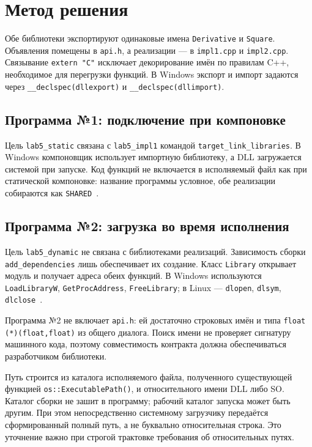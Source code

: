 \section{Метод решения}
Обе библиотеки экспортируют одинаковые имена \texttt{Derivative} и \texttt{Square}. Объявления помещены в \texttt{api.h}, а реализации --- в \texttt{impl1.cpp} и \texttt{impl2.cpp}. Связывание \texttt{extern "C"} исключает декорирование имён по правилам C++, необходимое для перегрузки функций. В Windows экспорт и импорт задаются через \texttt{\_\_declspec(dllexport)} и \texttt{\_\_declspec(dllimport)}.

\subsection{Программа №1: подключение при компоновке}
Цель \texttt{lab5\_static} связана с \texttt{lab5\_impl1} командой \texttt{target\_link\_libraries}. В Windows компоновщик использует импортную библиотеку, а DLL загружается системой при запуске. Код функций не включается в исполняемый файл как при статической компоновке: название программы условное, обе реализации собираются как \texttt{SHARED}~\cite{loadtime}.

\subsection{Программа №2: загрузка во время исполнения}
Цель \texttt{lab5\_dynamic} не связана с библиотеками реализаций. Зависимость сборки \texttt{add\_dependencies} лишь обеспечивает их создание. Класс \texttt{Library} открывает модуль и получает адреса обеих функций. В Windows используются \texttt{LoadLibraryW}, \texttt{GetProcAddress}, \texttt{FreeLibrary}; в Linux --- \texttt{dlopen}, \texttt{dlsym}, \texttt{dlclose}~\cite{runtime,dlopen,dlsym}.

Программа №2 не включает \texttt{api.h}: ей достаточно строковых имён и типа \texttt{float (*)(float,float)} из общего диалога. Поиск имени не проверяет сигнатуру машинного кода, поэтому совместимость контракта должна обеспечиваться разработчиком библиотеки.

Путь строится из каталога исполняемого файла, полученного существующей функцией \texttt{os::ExecutablePath()}, и относительного имени DLL либо SO. Каталог сборки не зашит в программу; рабочий каталог запуска может быть другим. При этом непосредственно системному загрузчику передаётся сформированный полный путь, а не буквально относительная строка. Это уточнение важно при строгой трактовке требования об относительных путях.

